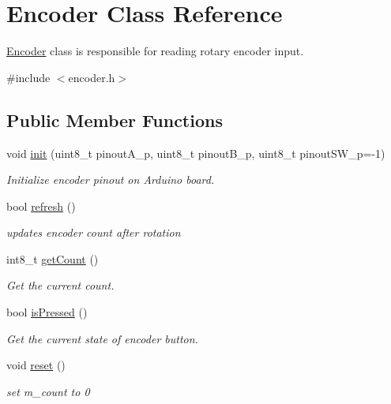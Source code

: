 \hypertarget{class_encoder}{}\section{Encoder Class Reference}
\label{class_encoder}


\hyperlink{class_encoder}{Encoder} class is responsible for reading rotary encoder input.  




{\ttfamily \#include $<$encoder.\+h$>$}

\subsection*{Public Member Functions}
\begin{DoxyCompactItemize}
\item 
void \hyperlink{class_encoder_a430e95a76f5b958b5350992c065d0b29}{init} (uint8\+\_\+t pinout\+A\+\_\+p, uint8\+\_\+t pinout\+B\+\_\+p, uint8\+\_\+t pinout\+S\+W\+\_\+p=-\/1)
\begin{DoxyCompactList}\small\item\em Initialize encoder pinout on Arduino board. \end{DoxyCompactList}\item 
bool \hyperlink{class_encoder_a85178b6e0978a7c342edbdce308d4abf}{refresh} ()
\begin{DoxyCompactList}\small\item\em updates encoder count after rotation \end{DoxyCompactList}\item 
int8\+\_\+t \hyperlink{class_encoder_a5e3fddf160e67d970c9c2cd57be5709a}{get\+Count} ()
\begin{DoxyCompactList}\small\item\em Get the current count. \end{DoxyCompactList}\item 
bool \hyperlink{class_encoder_ac7046bc89fc381018597bbba0cc0026e}{is\+Pressed} ()
\begin{DoxyCompactList}\small\item\em Get the current state of encoder button. \end{DoxyCompactList}\item 
\mbox{\label{class_encoder_a8ad34a60288f78310ee465da3832b405}} 
void \hyperlink{class_encoder_a8ad34a60288f78310ee465da3832b405}{reset} ()
\begin{DoxyCompactList}\small\item\em set m\+\_\+count to 0 \end{DoxyCompactList}\end{DoxyCompactItemize}


